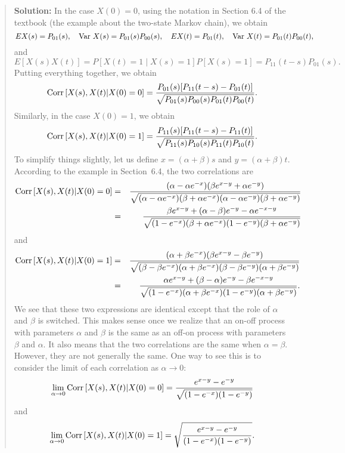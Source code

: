 \documentclass{article}
\def\Var{\mathop{\rm Var\,}\nolimits}
\def\Corr{\mathop{\rm Corr\,}\nolimits}
\begin{document}
\begin{enumerate}
\begin{quotation}{\bf Solution:}
  In the case $X(0)=0$, using the notation in Section 6.4 of the textbook (the example
  about the two-state Markov chain), we obtain
  \[
  E X(s) = P_{01}(s), \quad \Var X(s) = P_{01}(s)P_{00}(s),  \quad
  E X(t) = P_{01}(t), \quad \Var X(t) = P_{01}(t)P_{00}(t),
  \]
  and
  \[
  E [X(s)X(t)] = P[X(t)=1 \mid X(s)=1] P[X(s)=1] = P_{11}(t-s)P_{01}(s).
  \]
  Putting everything together, we obtain
  \[
  \Corr[X(s),X(t) | X(0)=0] = \frac{P_{01}(s) [ P_{11}(t-s) - P_{01}(t)]}
  {\sqrt{P_{01}(s)P_{00}(s)P_{01}(t)P_{00}(t)}}.
  \]  
  Similarly, in the case $X(0)=1$, we obtain
  \[
  \Corr[X(s),X(t) | X(0)=1] = \frac{P_{11}(s) [ P_{11}(t-s) - P_{11}(t)]}
  {\sqrt{P_{11}(s)P_{10}(s)P_{11}(t)P_{10}(t)}}.
  \]  
  To simplify things slightly, let us define $x=(\alpha+\beta)s$ and
  $y=(\alpha+\beta)t$.   According to the example in Section~6.4, the
  two correlations are
  \begin{eqnarray*}
  \Corr[X(s),X(t) | X(0)=0] 
  &=& \frac{(\alpha-\alpha e^{-x})(\beta e^{x-y}+\alpha e^{-y})}
  {\sqrt{ (\alpha-\alpha e^{-x}) (\beta+\alpha e^{-x}) 
     (\alpha-\alpha e^{-y}) (\beta+\alpha e^{-y}) }} \\
  &=& \frac{\beta e^{x-y} + (\alpha-\beta)e^{-y} - \alpha e^{-x-y}}
  {\sqrt{ (1- e^{-x}) (\beta+\alpha e^{-x}) 
     (1-e^{-y}) (\beta+\alpha e^{-y}) }}
  \end{eqnarray*}
  and
  \begin{eqnarray*}
  \Corr[X(s),X(t) | X(0)=1] 
  &=& \frac{(\alpha+\beta e^{-x})(\beta e^{x-y}-\beta e^{-y})}
  {\sqrt{ (\beta-\beta e^{-x}) (\alpha+\beta e^{-x}) 
     (\beta-\beta e^{-y}) (\alpha+\beta e^{-y}) }} \\
  &=& \frac{\alpha e^{x-y} + (\beta-\alpha)e^{-y} - \beta e^{-x-y}}
  {\sqrt{ (1- e^{-x}) (\alpha+\beta e^{-x}) 
     (1-e^{-y}) (\alpha+\beta e^{-y}) }}.
  \end{eqnarray*}
  We see that these two expressions are identical except that the
  role of $\alpha$ and $\beta$ is switched.  This makes sense once we realize
  that an on-off process with parameters $\alpha$ and $\beta$ is the same
  as an off-on process with parameters $\beta$ and $\alpha$.  It also means
  that the two correlations are the same when $\alpha=\beta$.
  However, they are not generally the same.  One way to see this is to 
  consider the limit of each correlation as $\alpha\to0$:
  \[
  \lim_{\alpha\to0}
  \Corr[X(s),X(t) | X(0)=0] = 
  \frac{e^{x-y}-e^{-y}}{\sqrt{(1-e^{-x})(1-e^{-y})}}
  \]
  and
  \[
  \lim_{\alpha\to0}
  \Corr[X(s),X(t) | X(0)=1] = 
  \sqrt{\frac{e^{x-y}-e^{-y}}{(1-e^{-x})(1-e^{-y})}}.
  \]  
  \end{quotation}
  

\end{enumerate}
\end{document}
